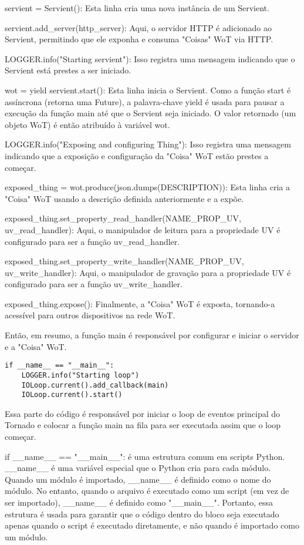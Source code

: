 servient = Servient(): Esta linha cria uma nova instância de um Servient.

servient.add\_server(http\_server): Aqui, o servidor HTTP é adicionado ao Servient, permitindo que ele exponha e consuma "Coisas" WoT via HTTP.

LOGGER.info("Starting servient"): Isso registra uma mensagem indicando que o Servient está prestes a ser iniciado.

wot = yield servient.start(): Esta linha inicia o Servient. Como a função start é assíncrona (retorna uma Future), a palavra-chave yield é usada para pausar a execução da função main até que o Servient seja iniciado. O valor retornado (um objeto WoT) é então atribuído à variável wot.

LOGGER.info("Exposing and configuring Thing"): Isso registra uma mensagem indicando que a exposição e configuração da "Coisa" WoT estão prestes a começar.

exposed\_thing = wot.produce(json.dumps(DESCRIPTION)): Esta linha cria a "Coisa" WoT usando a descrição definida anteriormente e a expõe.

exposed\_thing.set\_property\_read\_handler(NAME\_PROP\_UV, uv\_read\_handler): Aqui, o manipulador de leitura para a propriedade UV é configurado para ser a função uv\_read\_handler.

exposed\_thing.set\_property\_write\_handler(NAME\_PROP\_UV, uv\_write\_handler): Aqui, o manipulador de gravação para a propriedade UV é configurado para ser a função uv\_write\_handler.

exposed\_thing.expose(): Finalmente, a "Coisa" WoT é exposta, tornando-a acessível para outros dispositivos na rede WoT.

Então, em resumo, a função main é responsável por configurar e iniciar o servidor e a "Coisa" WoT.

\begin{verbatim}
if __name__ == "__main__":
    LOGGER.info("Starting loop")
    IOLoop.current().add_callback(main)
    IOLoop.current().start()
\end{verbatim}

Essa parte do código é responsável por iniciar o loop de eventos principal do Tornado e colocar a função main na fila para ser executada assim que o loop começar.

if \_\_name\_\_ == "\_\_main\_\_": é uma estrutura comum em scripts Python. \_\_name\_\_ é uma variável especial que o Python cria para cada módulo. Quando um módulo é importado, \_\_name\_\_ é definido como o nome do módulo. No entanto, quando o arquivo é executado como um script (em vez de ser importado), \_\_name\_\_ é definido como "\_\_main\_\_". Portanto, essa estrutura é usada para garantir que o código dentro do bloco seja executado apenas quando o script é executado diretamente, e não quando é importado como um módulo.

